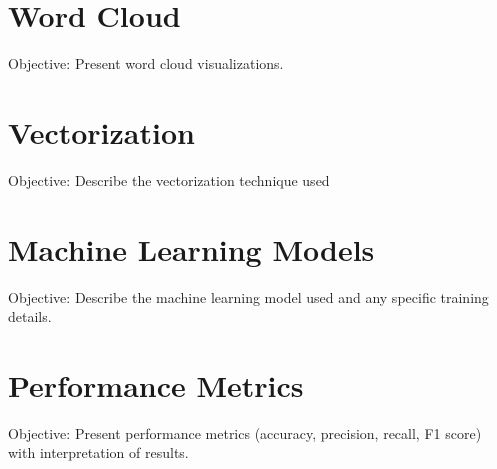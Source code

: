 \documentclass[12pt]{article}
\begin{document}
\section{Word Cloud}
Objective: Present word cloud visualizations.





\section{Vectorization}
Objective: Describe the vectorization technique used





\section{Machine Learning Models}
Objective: Describe the machine learning model used and any specific training details.





\section{Performance Metrics}
Objective: Present performance metrics (accuracy, precision, recall, F1 score) with interpretation of results.



\end{document}
